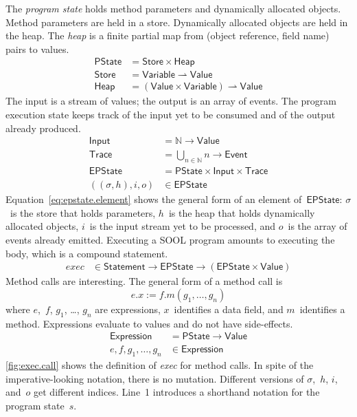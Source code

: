 \documentclass[preprint]{sigplanconf} %
\newcommand{\N}{\ensuremath{\mathbb{N}}}
\newcommand{\pmap}{\rightharpoonup}
\newcommand{\set}[1]{\ensuremath{\mathsf{#1}}}
\theoremstyle{definition}
\theoremstyle{remark}
\begin{document}
The \emph{program state} holds method parameters and dynamically allocated objects.
Method parameters are held in a store.
Dynamically allocated objects are held in the heap.
The \emph{heap} is a finite partial map from (object reference, field name) pairs to values.
\begin{align}
\set{PState}&=\set{Store}\times\set{Heap}\\
\set{Store}&=\set{Variable}\pmap\set{Value} \\
\set{Heap}&=(\set{Value}\times\set{Variable})\pmap\set{Value}
\end{align}
The input is a stream of values;
the output is an array of events.
The program execution state keeps track of the input yet to be consumed and of the output already produced.
\begin{align}
\set{Input}&=\N\to\set{Value} \label{eq:input}\\
\set{Trace}&=\bigcup_{n\in\N}n\to\set{Event} \\
\set{EPState}&=\set{PState}\times\set{Input}\times\set{Trace} \\
((\sigma, h), i, o)&\in\set{EPState} \label{eq:epstate.element}
\end{align}
Equation~\eqref{eq:epstate.element} shows the general form of an element of~\set{EPState}: $\sigma$~is the store that holds parameters, $h$~is the heap that holds dynamically allocated objects, $i$~is the input stream yet to be processed, and $o$~is the array of events already emitted.
Executing a SOOL program amounts to executing the \Verb@main@ body, which is a compound statement.
\begin{align}
\mathit{exec}&\in\set{Statement}\to\set{EPState}\to(\set{EPState}\times\set{Value})
\end{align}
Method calls are interesting.
The general form of a method call is \[ e.x := f.m(g_1,\ldots,g_n)\] where $e$,~$f$, $g_1$, \dots, $g_n$ are expressions, $x$~identifies a data field, and $m$~identifies a method.
Expressions evaluate to values and do not have side-effects.
\begin{align}
\set{Expression}&=\set{PState}\to\set{Value} \\
e,f,g_1,\ldots,g_n&\in\set{Expression}
\end{align}
\autoref{fig:exec.call} shows the definition of \textit{exec} for method calls.
In spite of the imperative-looking notation, there is no mutation.
Different versions of $\sigma$,~$h$, $i$, and~$o$ get different indices.
Line~1 introduces a shorthand notation for the program state~$s$.
\end{document}
